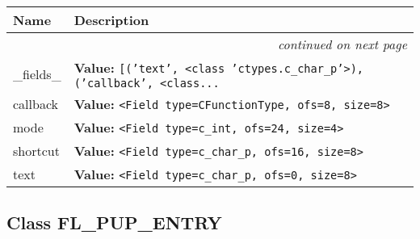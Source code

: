     \vspace{-1cm}
\hspace{\varindent}\begin{longtable}{|p{\varnamewidth}|p{\vardescrwidth}|l}
\cline{1-2}
\cline{1-2} \centering \textbf{Name} & \centering \textbf{Description}& \\
\cline{1-2}
\endhead\cline{1-2}\multicolumn{3}{r}{\small\textit{continued on next page}}\\\endfoot\cline{1-2}
\endlastfoot\raggedright \_\-f\-i\-e\-l\-d\-s\-\_\- & \raggedright \textbf{Value:} 
{\tt \texttt{[}\texttt{(}\texttt{'}\texttt{text}\texttt{'}\texttt{, }{\textless}class 'ctypes.c\_char\_p'{\textgreater}\texttt{)}\texttt{, }\texttt{(}\texttt{'}\texttt{callback}\texttt{'}\texttt{, }{\textless}class\texttt{...}}&\\
\cline{1-2}
\raggedright c\-a\-l\-l\-b\-a\-c\-k\- & \raggedright \textbf{Value:} 
{\tt {\textless}Field type=CFunctionType, ofs=8, size=8{\textgreater}}&\\
\cline{1-2}
\raggedright m\-o\-d\-e\- & \raggedright \textbf{Value:} 
{\tt {\textless}Field type=c\_int, ofs=24, size=4{\textgreater}}&\\
\cline{1-2}
\raggedright s\-h\-o\-r\-t\-c\-u\-t\- & \raggedright \textbf{Value:} 
{\tt {\textless}Field type=c\_char\_p, ofs=16, size=8{\textgreater}}&\\
\cline{1-2}
\raggedright t\-e\-x\-t\- & \raggedright \textbf{Value:} 
{\tt {\textless}Field type=c\_char\_p, ofs=0, size=8{\textgreater}}&\\
\cline{1-2}
\end{longtable}



\subsection{Class FL\_PUP\_ENTRY}

